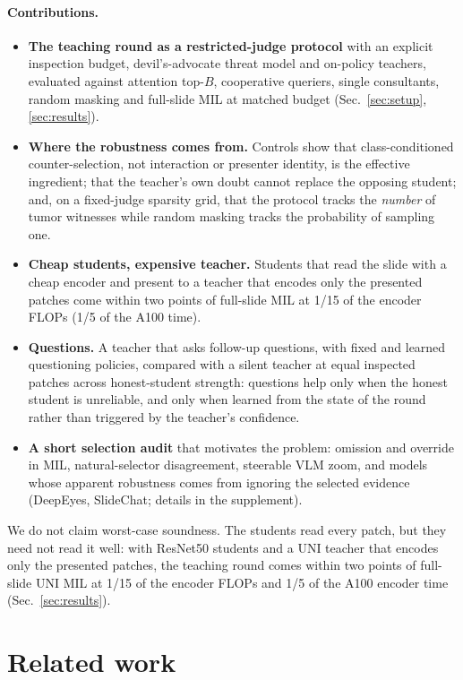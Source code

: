 \documentclass[10pt,twocolumn,letterpaper]{article}
\begin{document}
\paragraph{Contributions.}
\begin{itemize}
\item \textbf{The teaching round as a restricted-judge protocol} with an explicit inspection budget, devil's-advocate threat model and on-policy teachers, evaluated against attention top-$B$, cooperative queriers, single consultants, random masking and full-slide MIL at matched budget (Sec.~\ref{sec:setup}, \ref{sec:results}).
\item \textbf{Where the robustness comes from.} Controls show that class-conditioned counter-selection, not interaction or presenter identity, is the effective ingredient; that the teacher's own doubt cannot replace the opposing student; and, on a fixed-judge sparsity grid, that the protocol tracks the \emph{number} of tumor witnesses while random masking tracks the probability of sampling one.
\item \textbf{Cheap students, expensive teacher.} Students that read the slide with a cheap encoder and present to a teacher that encodes only the presented patches come within two points of full-slide MIL at 1/15 of the encoder FLOPs (1/5 of the A100 time).
\item \textbf{Questions.} A teacher that asks follow-up questions, with fixed and learned questioning policies, compared with a silent teacher at equal inspected patches across honest-student strength: questions help only when the honest student is unreliable, and only when learned from the state of the round rather than triggered by the teacher's confidence.
\item \textbf{A short selection audit} that motivates the problem: omission and override in MIL, natural-selector disagreement, steerable VLM zoom, and models whose apparent robustness comes from ignoring the selected evidence (DeepEyes, SlideChat; details in the supplement).
\end{itemize}
We do not claim worst-case soundness. The students read every patch, but they need not read it well: with ResNet50 students and a UNI teacher that encodes only the presented patches, the teaching round comes within two points of full-slide UNI MIL at 1/15 of the encoder FLOPs and 1/5 of the A100 encoder time (Sec.~\ref{sec:results}).

\section{Related work}\label{sec:related}
\end{document}
